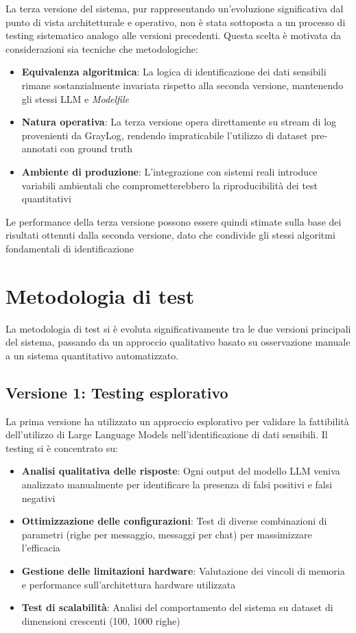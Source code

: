 \documentclass[12pt]{report}
\begin{document}
La terza versione del sistema, pur rappresentando un'evoluzione significativa dal punto di vista architetturale e operativo, non è stata sottoposta a un processo di testing sistematico analogo alle versioni precedenti. Questa scelta è motivata da considerazioni sia tecniche che metodologiche:

\begin{itemize}
    \item \textbf{Equivalenza algoritmica}: La logica di identificazione dei dati sensibili rimane sostanzialmente invariata rispetto alla seconda versione, mantenendo gli stessi LLM e \textit{Modelfile}
    \item \textbf{Natura operativa}: La terza versione opera direttamente su stream di log provenienti da GrayLog, rendendo impraticabile l'utilizzo di dataset pre-annotati con ground truth
    \item \textbf{Ambiente di produzione}: L'integrazione con sistemi reali introduce variabili ambientali che comprometterebbero la riproducibilità dei test quantitativi
\end{itemize}

Le performance della terza versione possono essere quindi stimate sulla base dei risultati ottenuti dalla seconda versione, dato che condivide gli stessi algoritmi fondamentali di identificazione

\section{Metodologia di test}
\label{sec:metodologia_test}

La metodologia di test si è evoluta significativamente tra le due versioni principali del sistema, passando da un approccio qualitativo basato su osservazione manuale a un sistema quantitativo automatizzato.

\subsection{Versione 1: Testing esplorativo}
\label{subsec:metodologia_v1}

La prima versione ha utilizzato un approccio esplorativo per validare la fattibilità dell'utilizzo di Large Language Models nell'identificazione di dati sensibili. Il testing si è concentrato su:

\begin{itemize}
    \item \textbf{Analisi qualitativa delle risposte}: Ogni output del modello LLM veniva analizzato manualmente per identificare la presenza di falsi positivi e falsi negativi
    \item \textbf{Ottimizzazione delle configurazioni}: Test di diverse combinazioni di parametri (righe per messaggio, messaggi per chat) per massimizzare l'efficacia
    \item \textbf{Gestione delle limitazioni hardware}: Valutazione dei vincoli di memoria e performance sull'architettura hardware utilizzata
    \item \textbf{Test di scalabilità}: Analisi del comportamento del sistema su dataset di dimensioni crescenti (100, 1000 righe)
\end{itemize}
\end{document}
